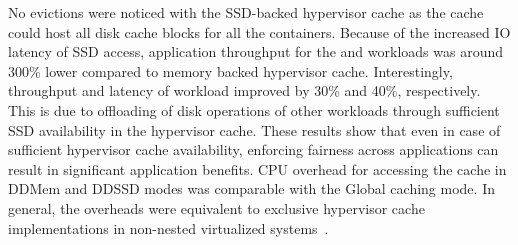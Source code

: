 No evictions were noticed with the SSD-backed hypervisor cache %
as the cache could host all disk cache blocks for all the
containers.
%
Because of the increased IO latency of SSD access, application
throughput for the \web{} and \video{} workloads 
was around 300\% lower compared to memory backed hypervisor cache.
%
Interestingly, throughput and latency of \mail{} workload improved
by 30\% and 40\%, respectively.
%
This is due to offloading of disk operations of other workloads 
through sufficient SSD availability in the hypervisor cache.
%
These results show that even in case of sufficient hypervisor cache
availability, enforcing fairness across applications can result in
significant application benefits.
%
CPU overhead for accessing the cache in DDMem and DDSSD 
modes was comparable with the Global caching mode.
% 
In general, the overheads were equivalent to exclusive hypervisor
cache implementations in non-nested virtualized systems~\cite{kvmzcache}. 
